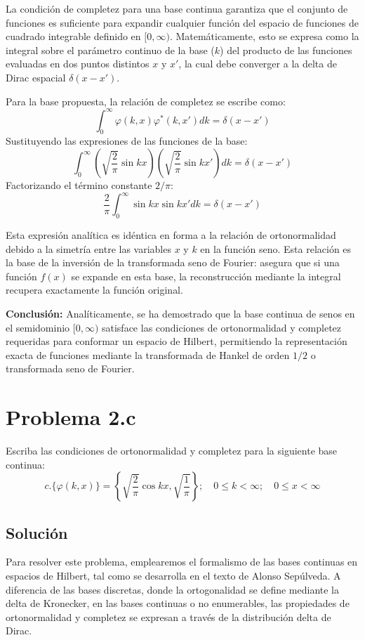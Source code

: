 \documentclass[a4paper]{article}
\begin{document}
La condición de completez para una base continua garantiza que el conjunto de funciones es suficiente para expandir cualquier función del espacio de funciones de cuadrado integrable definido en $[0, \infty)$. Matemáticamente, esto se expresa como la integral sobre el parámetro continuo de la base ($k$) del producto de las funciones evaluadas en dos puntos distintos $x$ y $x'$, la cual debe converger a la delta de Dirac espacial $\delta(x - x')$.

Para la base propuesta, la relación de completez se escribe como:
$$ \int_{0}^{\infty} \varphi(k, x) \varphi^*(k, x') dk = \delta(x - x') $$
Sustituyendo las expresiones de las funciones de la base:
$$ \int_{0}^{\infty} \left( \sqrt{\frac{2}{\pi}} \sin kx \right) \left( \sqrt{\frac{2}{\pi}} \sin kx' \right) dk = \delta(x - x') $$
Factorizando el término constante $2/\pi$:
$$ \frac{2}{\pi} \int_{0}^{\infty} \sin kx \sin kx' dk = \delta(x - x') $$

Esta expresión analítica es idéntica en forma a la relación de ortonormalidad debido a la simetría entre las variables $x$ y $k$ en la función seno. Esta relación es la base de la inversión de la transformada seno de Fourier: asegura que si una función $f(x)$ se expande en esta base, la reconstrucción mediante la integral recupera exactamente la función original.

\textbf{Conclusión:} Analíticamente, se ha demostrado que la base continua de senos en el semidominio $[0, \infty)$ satisface las condiciones de ortonormalidad y completez requeridas para conformar un espacio de Hilbert, permitiendo la representación exacta de funciones mediante la transformada de Hankel de orden $1/2$ o transformada seno de Fourier.


\section{Problema 2.c}
Escriba las condiciones de ortonormalidad y completez para la siguiente base continua:
$$ c. \{ \varphi(k, x) \} = \left\{ \sqrt{\frac{2}{\pi}} \cos kx, \sqrt{\frac{1}{\pi}} \right\} ; \quad 0 \leq k < \infty; \quad 0 \leq x < \infty $$

\subsection{Solución}

Para resolver este problema, emplearemos el formalismo de las bases continuas en espacios de Hilbert, tal como se desarrolla en el texto de Alonso Sepúlveda. A diferencia de las bases discretas, donde la ortogonalidad se define mediante la delta de Kronecker, en las bases continuas o no enumerables, las propiedades de ortonormalidad y completez se expresan a través de la distribución delta de Dirac.
\end{document}
